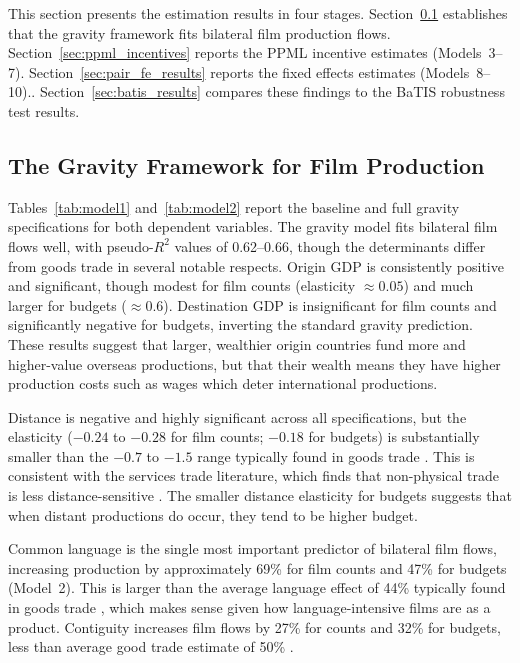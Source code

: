 
This section presents the estimation results in four stages. Section~\ref{sec:gravity_results} establishes that the gravity framework fits bilateral film production flows. Section~\ref{sec:ppml_incentives} reports the PPML incentive estimates (Models~3--7). Section~\ref{sec:pair_fe_results} reports the fixed effects estimates (Models~8--10).. Section~\ref{sec:batis_results} compares these findings to the BaTIS robustness test results.

\subsection{The Gravity Framework for Film Production}
\label{sec:gravity_results}

Tables~\ref{tab:model1} and~\ref{tab:model2} report the baseline and full gravity specifications for both dependent variables. The gravity model fits bilateral film flows well, with pseudo-$R^2$ values of 0.62--0.66, though the determinants differ from goods trade in several notable respects. Origin GDP is consistently positive and significant, though modest for film counts (elasticity $\approx 0.05$) and much larger for budgets ($\approx 0.6$). Destination GDP is insignificant for film counts and significantly negative for budgets, inverting the standard gravity prediction. These results suggest that larger, wealthier origin countries fund more and higher-value overseas productions, but that their wealth means they have higher production costs such as wages which deter international productions.

Distance is negative and highly significant across all specifications, but the elasticity ($-0.24$ to $-0.28$ for film counts; $-0.18$ for budgets) is substantially smaller than the $-0.7$ to $-1.5$ range typically found in goods trade \citep{head2014}. This is consistent with the services trade literature, which finds that non-physical trade is less distance-sensitive \citep{walsh2006, kimura2006}. The smaller distance elasticity for budgets suggests that when distant productions do occur, they tend to be higher budget.

Common language is the single most important predictor of bilateral film flows, increasing production by approximately 69\% for film counts and 47\% for budgets (Model~2). This is larger than the average language effect of 44\% typically found in goods trade \citep{egger2012}, which makes sense given how language-intensive films are as a product. Contiguity increases film flows by 27\% for counts and 32\% for budgets, less than average good trade estimate of 50\% \citep{head2014}.


